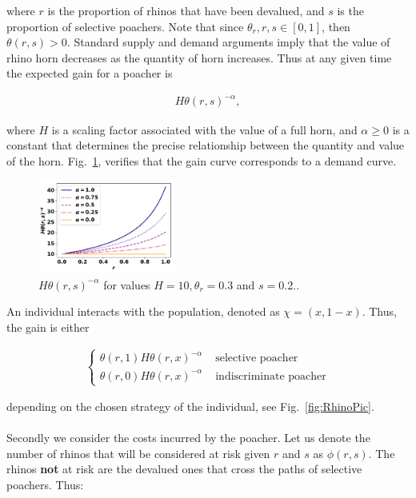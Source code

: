 \documentclass[10pt]{article}
\begin{document}
where \(r\) is the proportion of rhinos that have been devalued, and \(s\) is the 
proportion of selective poachers. Note that since \(\theta_r, r, s  \in [0, 1]\), then
\(\theta(r, s) > 0\). Standard supply and demand arguments imply that the value
of rhino horn decreases as the quantity of horn increases. Thus at any given time
the expected gain for a poacher is

\begin{eqnarray}
	\label{eqn:individual_gain}
 	H \theta(r,s)^{-\alpha},
\end{eqnarray}

where \(H\) is a scaling factor associated with the value of a full horn, and 
\(\alpha \geq 0\) is a constant that determines the precise relationship between
the quantity and value of the horn.  Fig.~\ref{fig:GainCurve}, verifies that the 
gain curve corresponds to a demand curve.

\begin{figure}[!htbp]
\centering
\includegraphics[width=0.4\textwidth]{images/gain_curve.pdf}
\caption{\label{fig:GainCurve} \(H \theta(r, s) ^{- \alpha}\) for values 
\(H = 10, \theta_r = 0.3\) and \(s = 0.2.\).}
\end{figure}

An individual interacts with the population, denoted as \(\chi=(x, 1 -x )\). Thus,
the gain is either

\begin{eqnarray}
	\label{eqn:gain}
	\left\{
	\begin{array}{cl}
	\theta(r, 1) H \theta(r, x)^{-\alpha} & \mbox{ selective poacher}
	\\
	\theta(r, 0) H \theta(r, x)^{-\alpha} & \mbox{ indiscriminate poacher}
	\end{array} \right.
\end{eqnarray}

depending on the chosen strategy of the individual, see Fig.~\ref{fig:RhinoPic}.
\\
\\
Secondly we consider the costs incurred by the poacher. Let us denote the number
of rhinos that will be considered at risk given \(r\) and \(s\) as \(\phi(r,s)\).
The rhinos \textbf{not} at risk are the devalued ones 
that cross the paths of selective poachers. Thus:
\end{document}
